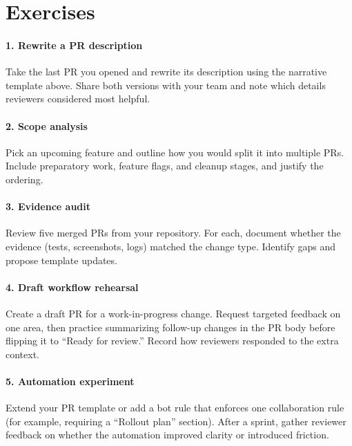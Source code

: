 \section*{Exercises}

\paragraph{1. Rewrite a PR description} Take the last PR you opened and rewrite its description using the narrative template above. Share both versions with your team and note which details reviewers considered most helpful.

\paragraph{2. Scope analysis} Pick an upcoming feature and outline how you would split it into multiple PRs. Include preparatory work, feature flags, and cleanup stages, and justify the ordering.

\paragraph{3. Evidence audit} Review five merged PRs from your repository. For each, document whether the evidence (tests, screenshots, logs) matched the change type. Identify gaps and propose template updates.

\paragraph{4. Draft workflow rehearsal} Create a draft PR for a work-in-progress change. Request targeted feedback on one area, then practice summarizing follow-up changes in the PR body before flipping it to ``Ready for review.'' Record how reviewers responded to the extra context.

\paragraph{5. Automation experiment} Extend your PR template or add a bot rule that enforces one collaboration rule (for example, requiring a ``Rollout plan'' section). After a sprint, gather reviewer feedback on whether the automation improved clarity or introduced friction.
